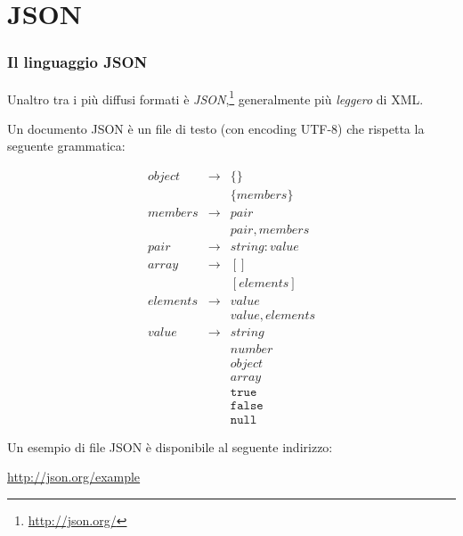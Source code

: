 \documentclass[8pt]{beamer}
\begin{document}

\section{JSON}

\begin{frame}
 \frametitle{Il linguaggio JSON}
 
 Unaltro tra i pi\`u diffusi formati \`e \emph{JSON},\footnote{\url{http://json.org/}}
 generalmente pi\`u \emph{leggero} di XML.
 \vspace{\baselineskip}

 Un documento JSON \`e un file di testo (con encoding UTF-8) che rispetta la seguente grammatica:

\begin{small}
\[
  \begin{array}{ccl}
object & \rightarrow & \{\}\\
&&\{members\}\\
members & \rightarrow & pair \\
&&pair , members \\
pair & \rightarrow & string : value \\
array & \rightarrow & [] \\
&&[ elements ] \\
elements & \rightarrow & value \\ 
&&value , elements \\
value & \rightarrow & string \\
&&number\\
&&object\\
&&array\\
&&\mathtt{true}\\
&&\mathtt{false}\\
&&\mathtt{null} 
\end{array}
\]
\end{small}
 \vspace{\baselineskip}

 Un esempio di file JSON \`e disponibile al seguente indirizzo:
\begin{center}
 \begin{small}
  \url{http://json.org/example}
 \end{small}
\end{center}
\end{frame}
\end{document}
